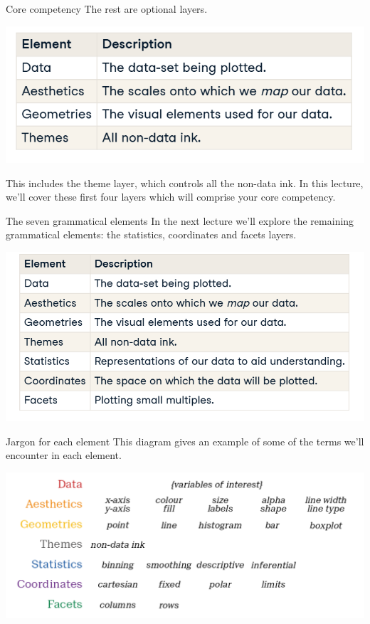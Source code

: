 \documentclass[
  ignorenonframetext,
]{beamer}
\begin{document}
\begin{frame}{Core competency}
\label{core-competency}
The rest are optional layers.

\includegraphics{../images/im123.png}

This includes the theme layer, which controls all the non-data ink. In
this lecture, we'll cover these first four layers which will comprise
your core competency.
\end{frame}

\begin{frame}{The seven grammatical elements}
\label{the-seven-grammatical-elements}
In the next lecture we'll explore the remaining grammatical elements:
the statistics, coordinates and facets layers.

\includegraphics{../images/im124.png}
\end{frame}

\begin{frame}{Jargon for each element}
\label{jargon-for-each-element}
This diagram gives an example of some of the terms we'll encounter in
each element.

\includegraphics{../images/im125.png}
\end{frame}
\end{document}
